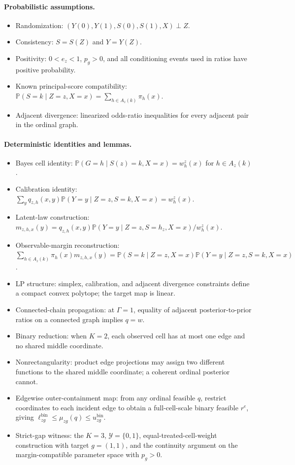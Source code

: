 \documentclass[11pt]{article}
\renewcommand{\Pr}{\mathbb{P}}
\theoremstyle{definition}
\theoremstyle{plain}
\theoremstyle{remark}
\begin{document}
\paragraph{Probabilistic assumptions.}
\begin{itemize}
  \item Randomization:
  \((Y(0),Y(1),S(0),S(1),X)\perp Z\).
  \item Consistency:
  \(S=S(Z)\) and \(Y=Y(Z)\).
  \item Positivity:
  \(0<e_z<1\), \(p_g>0\), and all conditioning events used in ratios have
  positive probability.
  \item Known principal-score compatibility:
  \(\Pr(S=k\mid Z=z,X=x)=\sum_{h\in A_z(k)}\pi_h(x)\).
  \item Adjacent divergence:
  linearized odds-ratio inequalities for every adjacent pair in the ordinal
  graph.
\end{itemize}

\paragraph{Deterministic identities and lemmas.}
\begin{itemize}
  \item Bayes cell identity:
  \(\Pr(G=h\mid S(z)=k,X=x)=w^z_h(x)\) for \(h\in A_z(k)\).
  \item Calibration identity:
  \(\sum_y q_{z,h}(x,y)\Pr(Y=y\mid Z=z,S=k,X=x)=w^z_h(x)\).
  \item Latent-law construction:
  \(m_{z,h,x}(y)=q_{z,h}(x,y)\Pr(Y=y\mid Z=z,S=h_z,X=x)/w^z_h(x)\).
  \item Observable-margin reconstruction:
  \(\sum_{h\in A_z(k)}\pi_h(x)m_{z,h,x}(y)
  =
  \Pr(S=k\mid Z=z,X=x)\Pr(Y=y\mid Z=z,S=k,X=x)\).
  \item LP structure:
  simplex, calibration, and adjacent divergence constraints define a compact
  convex polytope; the target map is linear.
  \item Connected-chain propagation:
  at \(\Gamma=1\), equality of adjacent posterior-to-prior ratios on a
  connected graph implies \(q=w\).
  \item Binary reduction:
  when \(K=2\), each observed cell has at most one edge and no shared middle
  coordinate.
  \item Nonrectangularity:
  product edge projections may assign two different functions to the shared
  middle coordinate; a coherent ordinal posterior cannot.
  \item Edgewise outer-containment map:
  from any ordinal feasible \(q\), restrict coordinates to each incident edge
  to obtain a full-cell-scale binary feasible \(r^e\), giving
  \(\ell^{\mathrm{bin}}_{zg}\le\mu_{zg}(q)\le u^{\mathrm{bin}}_{zg}\).
  \item Strict-gap witness:
  the \(K=3\), \(\mathcal Y=\{0,1\}\), equal-treated-cell-weight construction
  with target \(g=(1,1)\), and the continuity argument on the
  margin-compatible parameter space with \(p_g>0\).
\end{itemize}
\end{document}
